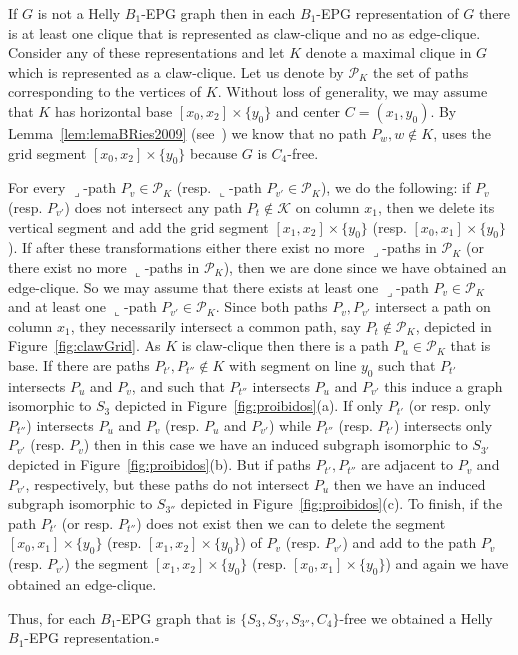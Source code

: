 \documentclass[9pt]{entcs}
\begin{document}
\begin{pf}
If $G$ is not a Helly $B_1$-EPG graph then in each $B_1$-EPG representation of $G$ there is at least one clique that is represented as claw-clique and no as edge-clique. Consider any of these  representations and let $K$ denote a maximal clique in $G$ which is represented as a claw-clique. Let us denote by  $\mathcal{P}_K$ the set of paths corresponding to the vertices of $K$. 
Without loss of generality, we may assume that $K$  has horizontal base $[x_0, x_2]\times\{y_0\}$ and center $C = (x_1, y_0)$. By Lemma~\ref{lem:lemaBRies2009} (see~\cite{ries2009}) we know that no path $P_w, w\notin K$, uses the grid segment $[x_0, x_2]\times\{y_0\}$ because $G$ is $C_4$-free.

 For every ${\displaystyle \lrcorner}$-path $P_v \in \mathcal{P}_K$ (resp. ${\displaystyle \llcorner}$-path $P_{v'} \in \mathcal{P}_K$), we do the following: if $P_v$ (resp. $P_{v'}$) does not intersect any path $P_t \notin \mathcal{K}$ on column $x_1$, then we delete its vertical segment and add the grid segment $[x_1, x_2]\times\{y_0\}$ (resp. $[x_0, x_1]\times\{y_0\}$). If after these transformations either there exist no more ${\displaystyle \lrcorner}$-paths in $\mathcal{P}_K$ (or there exist no more ${\displaystyle \llcorner}$-paths in $\mathcal{P}_K$), then we are done since we have obtained an edge-clique. So we may assume that there exists at least one ${\displaystyle \lrcorner}$-path $P_v \in \mathcal{P}_K$ and at least one ${\displaystyle \llcorner}$-path $P_{v'} \in \mathcal{P}_K$. Since both paths $P_v, P_{v'}$ intersect a path on column $x_1$, they necessarily intersect a common path, say $P_t \notin \mathcal{P}_K$, depicted in Figure~\ref{fig:clawGrid}. As $K$ is claw-clique then there is a path $P_u \in \mathcal{P}_K$ that is base. If there are paths $P_{t'}, P_{t''} \notin K$ with segment on line $y_0$ such that $P_{t'}$  intersects $P_{u}$ and $P_{v}$, and such that $P_{t''}$ intersects $P_{u}$ and $P_{v'}$ this induce a graph isomorphic to $S_3$ depicted in Figure~\ref{fig:proibidos}(a). If only $P_{t'}$ (or resp. only $P_{t''}$) intersects $P_{u}$ and $P_{v}$ (resp. $P_{u}$ and $P_{v'}$) while $P_{t''}$ (resp. $P_{t'}$) intersects only $P_{v'}$ (resp. $P_{v}$) then in this case we have an induced subgraph isomorphic to $S_{3'}$ depicted in Figure~\ref{fig:proibidos}(b). But if paths $P_{t'}, P_{t''}$ are adjacent to $P_v$ and $P_{v'}$, respectively, but these paths do not intersect $P_u$ then we have an induced subgraph isomorphic to $S_{3''}$ depicted in Figure~\ref{fig:proibidos}(c). To finish, if the path $P_{t'}$ (or resp. $P_{t''}$) does not exist then we can to delete the segment $[x_0,x_1]\times \{y_0\}$ (resp. $[x_1,x_2]\times \{y_0\}$) of $P_v$ (resp. $P_{v'}$) and add to the path $P_v$ (resp. $P_{v'}$) the segment $[x_1,x_2]\times \{y_0\}$ (resp. $[x_0,x_1]\times \{y_0\}$) and again we have obtained an edge-clique.
 
 Thus, for each $B_1$-EPG graph that is $\{S_{3}, S_{3'}, S_{3''}, C_{4}\}$-free we obtained a Helly $B_1$-EPG representation.$\square$
\end{pf}
\end{document}

